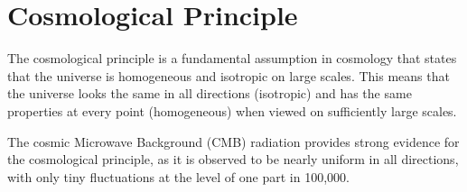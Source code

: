 \newpage
\section{Cosmological Principle}

The cosmological principle is a fundamental assumption in cosmology that states that the universe is homogeneous and isotropic on large scales. This means that the universe looks the same in all directions (isotropic) and has the same properties at every point (homogeneous) when viewed on sufficiently large scales.

\begin{extra}
  The cosmic Microwave Background (CMB) radiation provides strong evidence for the cosmological principle, as it is observed to be nearly uniform in all directions, with only tiny fluctuations at the level of one part in 100,000.
\end{extra}

\clearpage
